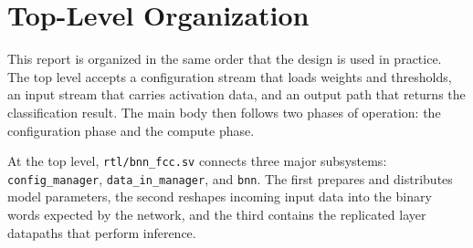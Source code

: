 \section{Top-Level Organization}

This report is organized in the same order that the design is used in practice.
The top level accepts a configuration stream that loads weights and thresholds,
an input stream that carries activation data, and an output path that returns
the classification result. The main body then follows two phases of operation:
the configuration phase and the compute phase.

At the top level, \texttt{rtl/bnn\_fcc.sv} connects three major subsystems:
\texttt{config\_manager}, \texttt{data\_in\_manager}, and \texttt{bnn}. The
first prepares and distributes model parameters, the second reshapes incoming
input data into the binary words expected by the network, and the third
contains the replicated layer datapaths that perform inference.

\begin{strip}
  \centering
  \resizebox{\textwidth}{!}{}
  \label{fig:bnn-fcc-top}
\end{strip}

